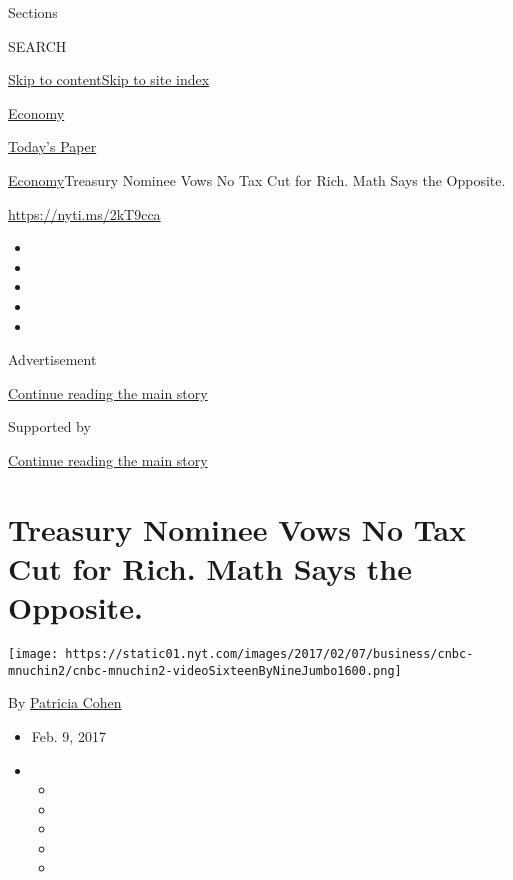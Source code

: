 Sections

SEARCH

\protect\hyperlink{site-content}{Skip to
content}\protect\hyperlink{site-index}{Skip to site index}

\href{https://www.nytimes.com/section/business/economy}{Economy}

\href{https://myaccount.nytimes.com/auth/login?response_type=cookie\&client_id=vi}{}

\href{https://www.nytimes.com/section/todayspaper}{Today's Paper}

\href{/section/business/economy}{Economy}\textbar{}Treasury Nominee Vows
No Tax Cut for Rich. Math Says the Opposite.

\url{https://nyti.ms/2kT9cca}

\begin{itemize}
\item
\item
\item
\item
\item
\end{itemize}

Advertisement

\protect\hyperlink{after-top}{Continue reading the main story}

Supported by

\protect\hyperlink{after-sponsor}{Continue reading the main story}

\hypertarget{treasury-nominee-vows-no-tax-cut-for-rich-math-says-the-opposite}{%
\section{Treasury Nominee Vows No Tax Cut for Rich. Math Says the
Opposite.}\label{treasury-nominee-vows-no-tax-cut-for-rich-math-says-the-opposite}}

\texttt{[image: https://static01.nyt.com/images/2017/02/07/business/cnbc-mnuchin2/cnbc-mnuchin2-videoSixteenByNineJumbo1600.png]}

By \href{http://www.nytimes.com/by/patricia-cohen}{Patricia Cohen}

\begin{itemize}
\item
  Feb. 9, 2017
\item
  \begin{itemize}
  \item
  \item
  \item
  \item
  \item
  \end{itemize}
\end{itemize}

